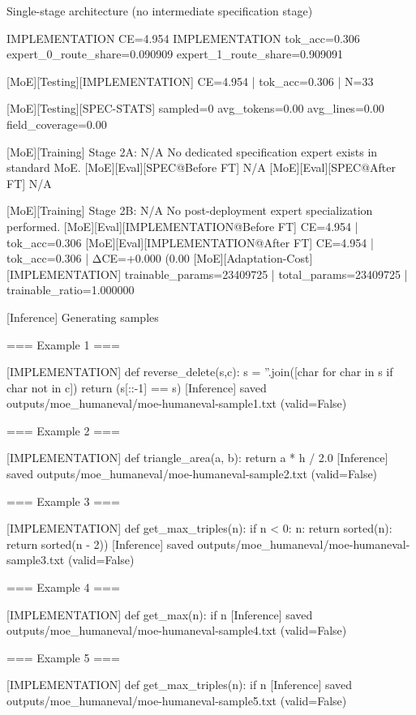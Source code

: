 Single-stage architecture (no intermediate specification stage)

IMPLEMENTATION CE=4.954
IMPLEMENTATION tok_acc=0.306
expert_0_route_share=0.090909
expert_1_route_share=0.909091

[MoE][Testing][IMPLEMENTATION] CE=4.954 | tok_acc=0.306 | N=33

[MoE][Testing][SPEC-STATS]
sampled=0
avg_tokens=0.00
avg_lines=0.00
field_coverage=0.00

[MoE][Training] Stage 2A: N/A
No dedicated specification expert exists in standard MoE.
[MoE][Eval][SPEC@Before FT] N/A
[MoE][Eval][SPEC@After FT] N/A

[MoE][Training] Stage 2B: N/A
No post-deployment expert specialization performed.
[MoE][Eval][IMPLEMENTATION@Before FT] CE=4.954 | tok_acc=0.306
[MoE][Eval][IMPLEMENTATION@After FT] CE=4.954 | tok_acc=0.306 | ΔCE=+0.000 (0.00%
[MoE][Adaptation-Cost][IMPLEMENTATION] trainable_params=23409725 | total_params=23409725 | trainable_ratio=1.000000

[Inference] Generating samples

=== Example 1 ===

[IMPLEMENTATION]
def reverse_delete(s,c): s = ''.join([char for char in s if char not in c]) return (s[::-1] == s)
[Inference] saved outputs/moe_humaneval/moe-humaneval-sample1.txt (valid=False)

=== Example 2 ===

[IMPLEMENTATION]
def triangle_area(a, b): return a * h / 2.0
[Inference] saved outputs/moe_humaneval/moe-humaneval-sample2.txt (valid=False)

=== Example 3 ===

[IMPLEMENTATION]
def get_max_triples(n): if n < 0: n: return sorted(n): return sorted(n - 2))
[Inference] saved outputs/moe_humaneval/moe-humaneval-sample3.txt (valid=False)

=== Example 4 ===

[IMPLEMENTATION]
def get_max(n): if n%
[Inference] saved outputs/moe_humaneval/moe-humaneval-sample4.txt (valid=False)

=== Example 5 ===

[IMPLEMENTATION]
def get_max_triples(n): if n%
[Inference] saved outputs/moe_humaneval/moe-humaneval-sample5.txt (valid=False)

